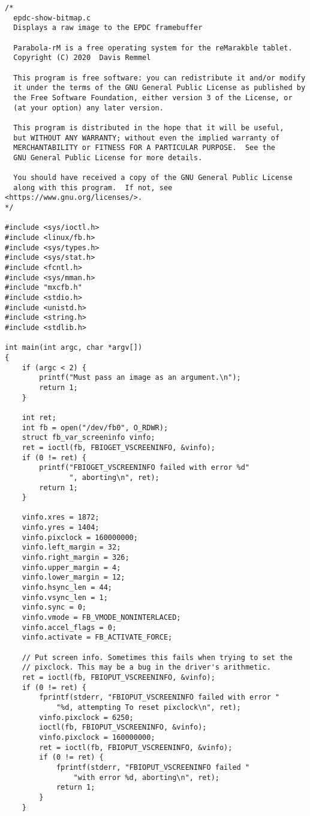 \documentclass{memoir}
\begin{document}
\begin{verbatim}
/*
  epdc-show-bitmap.c
  Displays a raw image to the EPDC framebuffer

  Parabola-rM is a free operating system for the reMarakble tablet.
  Copyright (C) 2020  Davis Remmel

  This program is free software: you can redistribute it and/or modify
  it under the terms of the GNU General Public License as published by
  the Free Software Foundation, either version 3 of the License, or
  (at your option) any later version.

  This program is distributed in the hope that it will be useful,
  but WITHOUT ANY WARRANTY; without even the implied warranty of
  MERCHANTABILITY or FITNESS FOR A PARTICULAR PURPOSE.  See the
  GNU General Public License for more details.

  You should have received a copy of the GNU General Public License
  along with this program.  If not, see <https://www.gnu.org/licenses/>.
*/

#include <sys/ioctl.h>
#include <linux/fb.h>
#include <sys/types.h>
#include <sys/stat.h>
#include <fcntl.h>
#include <sys/mman.h>
#include "mxcfb.h"
#include <stdio.h>
#include <unistd.h>
#include <string.h>
#include <stdlib.h>

int main(int argc, char *argv[])
{
	if (argc < 2) {
		printf("Must pass an image as an argument.\n");
		return 1;
	}

	int ret;
	int fb = open("/dev/fb0", O_RDWR);
	struct fb_var_screeninfo vinfo;
	ret = ioctl(fb, FBIOGET_VSCREENINFO, &vinfo);
	if (0 != ret) {
		printf("FBIOGET_VSCREENINFO failed with error %d"
		       ", aborting\n", ret);
		return 1;
	}
	
	vinfo.xres = 1872;
	vinfo.yres = 1404;
	vinfo.pixclock = 160000000;
	vinfo.left_margin = 32;
	vinfo.right_margin = 326;
	vinfo.upper_margin = 4;
	vinfo.lower_margin = 12;
	vinfo.hsync_len = 44;
	vinfo.vsync_len = 1;
	vinfo.sync = 0;
	vinfo.vmode = FB_VMODE_NONINTERLACED;
	vinfo.accel_flags = 0;
	vinfo.activate = FB_ACTIVATE_FORCE;

	// Put screen info. Sometimes this fails when trying to set the
	// pixclock. This may be a bug in the driver's arithmetic.
	ret = ioctl(fb, FBIOPUT_VSCREENINFO, &vinfo);
	if (0 != ret) {
		fprintf(stderr, "FBIOPUT_VSCREENINFO failed with error "
			"%d, attempting To reset pixclock\n", ret);
		vinfo.pixclock = 6250;
		ioctl(fb, FBIOPUT_VSCREENINFO, &vinfo);
		vinfo.pixclock = 160000000;
		ret = ioctl(fb, FBIOPUT_VSCREENINFO, &vinfo);
		if (0 != ret) {
			fprintf(stderr, "FBIOPUT_VSCREENINFO failed "
				"with error %d, aborting\n", ret);
			return 1;
		}
	}


\end{verbatim}
\end{document}
